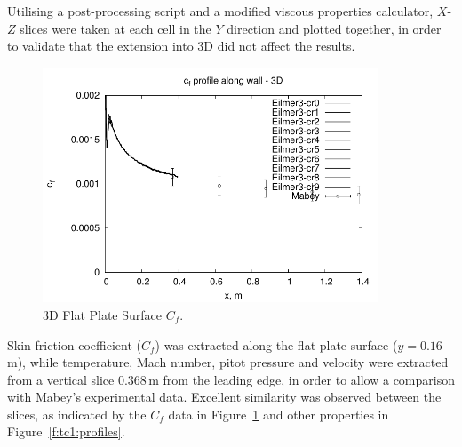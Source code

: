 Utilising a post-processing script and a modified viscous properties calculator, $X$-$Z$ slices were taken at each cell in the $Y$ direction and plotted together, in order to validate that the extension into 3D did not affect the results.
%
\begin{figure}[htbp]
 \begin{center}
  \includegraphics[width=10cm]{./chap6-3Dflatplate/figs/3Dslices/mabey-cf.pdf}
  \caption{3D Flat Plate Surface $C_f$.}
  \label{f:tc1:cf}
 \end{center}
\end{figure}
%
Skin friction coefficient ($C_f$) was extracted along the flat plate surface ($y=0.16$\,m), while temperature, Mach number, pitot pressure and velocity were extracted from a vertical slice $0.368$\,m from the leading edge, in order to allow a comparison with Mabey's experimental data. Excellent similarity was observed between the slices, as indicated by the $C_f$ data in Figure~\ref{f:tc1:cf} and other properties in Figure~\ref{f:tc1:profiles}. 

